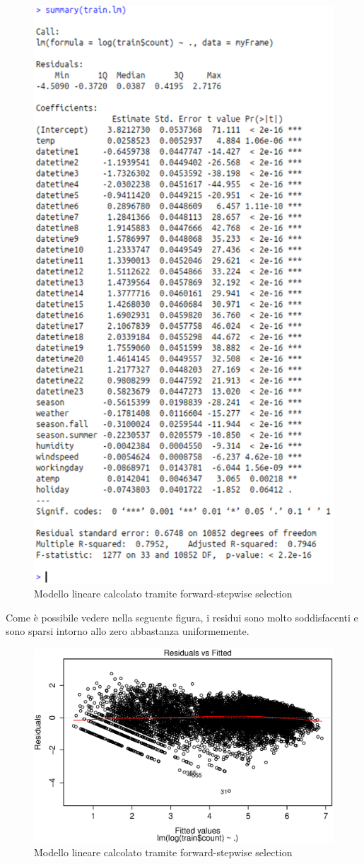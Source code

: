 \begin{figure}[H]
  \centering
  \includegraphics[width=.55\columnwidth]{images/lm-after-fwd-steps.eps}
  \caption{Modello lineare calcolato tramite forward-stepwise selection}
    \label{fig:lm-after-fwd-steps}
\end{figure}

Come è possibile vedere nella seguente figura, i residui sono molto
soddisfacenti e sono sparsi intorno allo zero abbastanza uniformemente.

\begin{figure}[H]
  \centering
  \includegraphics[width=.55\columnwidth]{images/fwd-sw-residuals.eps}
  \caption{Modello lineare calcolato tramite forward-stepwise selection}
    \label{fig:fwd-sw-residuals}
\end{figure}


